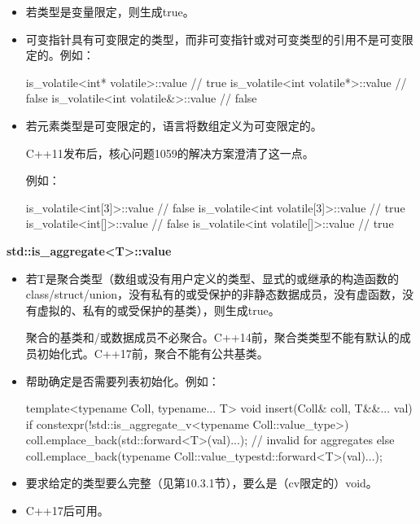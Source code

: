 \begin{itemize}
\item 
若类型是变量限定，则生成true。

\item 
可变指针具有可变限定的类型，而非可变指针或对可变类型的引用不是可变限定的。例如：

\begin{cpp}
is_volatile<int* volatile>::value // true
is_volatile<int volatile*>::value // false
is_volatile<int volatile&>::value // false
\end{cpp}

\item 
若元素类型是可变限定的，语言将数组定义为可变限定的。

\begin{notice}
C++11发布后，核心问题1059的解决方案澄清了这一点。
\end{notice}

例如：
\begin{cpp}
is_volatile<int[3]>::value // false
is_volatile<int volatile[3]>::value // true
is_volatile<int[]>::value // false
is_volatile<int volatile[]>::value // true
\end{cpp}
\end{itemize}

\textbf{std::is\_aggregate<T>::value}

\begin{itemize}
\item 
若T是聚合类型（数组或没有用户定义的类型、显式的或继承的构造函数的class/struct/union，没有私有的或受保护的非静态数据成员，没有虚函数，没有虚拟的、私有的或受保护的基类），则生成true。

\begin{notice}
聚合的基类和/或数据成员不必聚合。C++14前，聚合类类型不能有默认的成员初始化式。C++17前，聚合不能有公共基类。
\end{notice}

\item 
帮助确定是否需要列表初始化。例如：
\begin{cpp}
template<typename Coll, typename... T>
void insert(Coll& coll, T&&... val) {
	if constexpr(!std::is_aggregate_v<typename Coll::value_type>) {
		coll.emplace_back(std::forward<T>(val)...); // invalid for aggregates
	}
	else {
		coll.emplace_back(typename Coll::value_type{std::forward<T>(val)...});
	}
}
\end{cpp}

\item 
要求给定的类型要么完整（见第10.3.1节），要么是（cv限定的）void。

\item 
C++17后可用。
\end{itemize}

